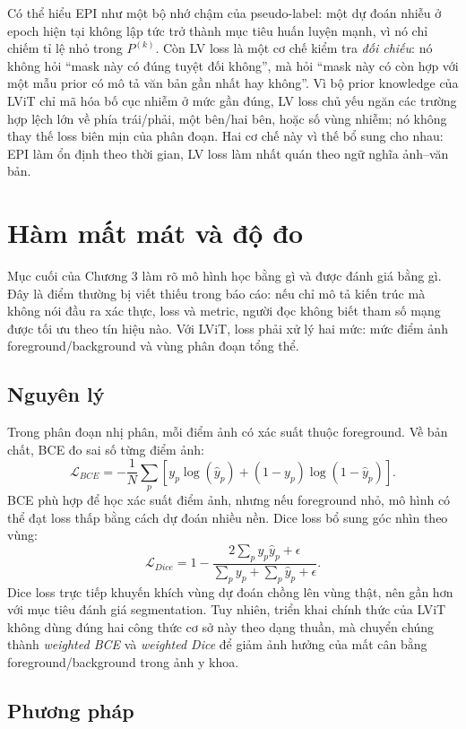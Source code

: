 Có thể hiểu EPI như một bộ nhớ chậm của pseudo-label: một dự đoán nhiễu ở epoch hiện tại không lập tức trở thành mục tiêu huấn luyện mạnh, vì nó chỉ chiếm tỉ lệ nhỏ trong \(P^{(k)}\). Còn LV loss là một cơ chế kiểm tra \emph{đối chiếu}: nó không hỏi ``mask này có đúng tuyệt đối không'', mà hỏi ``mask này có còn hợp với một mẫu prior có mô tả văn bản gần nhất hay không''. Vì bộ prior knowledge của LViT chỉ mã hóa bố cục nhiễm ở mức gần đúng, LV loss chủ yếu ngăn các trường hợp lệch lớn về phía trái/phải, một bên/hai bên, hoặc số vùng nhiễm; nó không thay thế loss biên mịn của phân đoạn. Hai cơ chế này vì thế bổ sung cho nhau: EPI làm ổn định theo thời gian, LV loss làm nhất quán theo ngữ nghĩa ảnh--văn bản.

\section{Hàm mất mát và độ đo}

Mục cuối của Chương 3 làm rõ mô hình học bằng gì và được đánh giá bằng gì. Đây là điểm thường bị viết thiếu trong báo cáo: nếu chỉ mô tả kiến trúc mà không nói đầu ra xác thực, loss và metric, người đọc không biết tham số mạng được tối ưu theo tín hiệu nào. Với LViT, loss phải xử lý hai mức: mức điểm ảnh foreground/background và vùng phân đoạn tổng thể.

\subsection*{Nguyên lý}

Trong phân đoạn nhị phân, mỗi điểm ảnh có xác suất thuộc foreground. Về bản chất, BCE đo sai số từng điểm ảnh:
\[
\mathcal{L}_{BCE}
=-\frac{1}{N}\sum_{p}
\left[
y_p\log(\hat{y}_p)
+(1-y_p)\log(1-\hat{y}_p)
\right].
\]
BCE phù hợp để học xác suất điểm ảnh, nhưng nếu foreground nhỏ, mô hình có thể đạt loss thấp bằng cách dự đoán nhiều nền. Dice loss bổ sung góc nhìn theo vùng:
\[
\mathcal{L}_{Dice}
=1-\frac{2\sum_p y_p\hat{y}_p+\epsilon}
{\sum_p y_p+\sum_p\hat{y}_p+\epsilon}.
\]
Dice loss trực tiếp khuyến khích vùng dự đoán chồng lên vùng thật, nên gần hơn với mục tiêu đánh giá segmentation. Tuy nhiên, triển khai chính thức của LViT không dùng đúng hai công thức cơ sở này theo dạng thuần, mà chuyển chúng thành \emph{weighted BCE} và \emph{weighted Dice} để giảm ảnh hưởng của mất cân bằng foreground/background trong ảnh y khoa.

\subsection*{Phương pháp}

